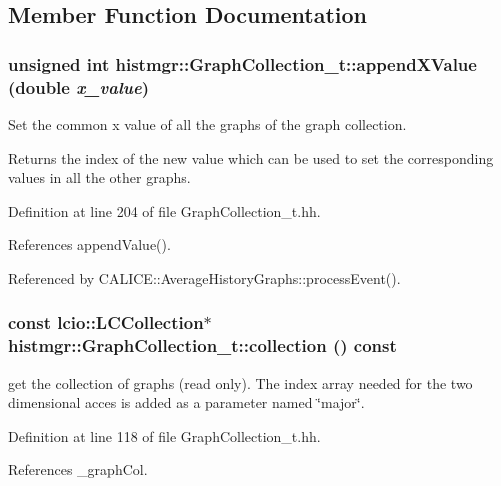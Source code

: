 \subsection{Member Function Documentation}
\subsubsection[{appendXValue}]{\setlength{\rightskip}{0pt plus 5cm}unsigned int histmgr::GraphCollection\_\-t::appendXValue (double {\em x\_\-value})\hspace{0.3cm}{\ttfamily  [inline]}}\label{classhistmgr_1_1GraphCollection__t_ae9c83cf79211ef808f75343c7c3c3c3d}


Set the common x value of all the graphs of the graph collection. \begin{DoxyReturn}{Returns}
the index of the new value which can be used to set the corresponding values in all the other graphs. 
\end{DoxyReturn}


Definition at line 204 of file GraphCollection\_\-t.hh.

References appendValue().

Referenced by CALICE::AverageHistoryGraphs::processEvent().
\subsubsection[{collection}]{\setlength{\rightskip}{0pt plus 5cm}const lcio::LCCollection$\ast$ histmgr::GraphCollection\_\-t::collection () const\hspace{0.3cm}{\ttfamily  [inline]}}\label{classhistmgr_1_1GraphCollection__t_ab8754e9146c1fe855d176fe472413cf1}


get the collection of graphs (read only). The index array needed for the two dimensional acces is added as a parameter named \char`\"{}major\char`\"{}. 

Definition at line 118 of file GraphCollection\_\-t.hh.

References \_\-graphCol.
